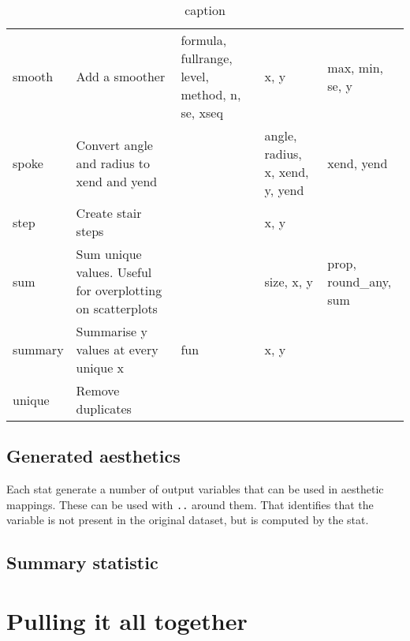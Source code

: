 \begin{table}
\begin{center}
\begin{tabular}{lp{1.5in}p{2in}p{1in}p{1.5in}}
    smooth       & Add a smoother                                              & formula, fullrange, level, method, n, se, xseq & x, y                            & max, min, se, y                      \\
    spoke        & Convert angle and radius to xend and yend                   &                                                & angle, radius, x, xend, y, yend & xend, yend                           \\
    step         & Create stair steps                                          &                                                & x, y                            &                                      \\
    sum          & Sum unique values.  Useful for overplotting on scatterplots &                                                & size, x, y                      & prop, round\_any, sum               \\
    summary      & Summarise y values at every unique x                        & fun                                            & x, y                            &                                      \\
    unique       & Remove duplicates                                           &                                                &                                 &                                      \\
    \bottomrule
  \end{tabular}
  \end{center}
  \caption{caption}
  \label{label}
\end{table}


\subsection{Generated aesthetics}
\label{sub:generated_aesthetics}

Each stat generate a number of output variables that can be used in aesthetic mappings.  These can be used with {\tt ..} around them.  That identifies that the variable is not present in the original dataset, but is computed by the stat.

\subsection{Summary statistic}
\label{sub:summary_statistic}

\section{Pulling it all together}
\label{sec:pulling_it_all_together}

